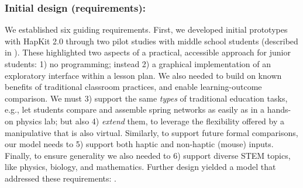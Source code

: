 \subsubsection{Initial design (requirements):}
We established six guiding requirements. %
First, we developed initial prototypes with HapKit 2.0
through two pilot studies with middle school students (described in \cite{Martinez2016}).
These highlighted two aspects of a practical, accessible approach for junior students: 1) no programming; instead 2) a graphical implementation of an exploratory interface within a lesson plan.
We also needed to build on known benefits of traditional classroom practices, and enable learning-outcome comparison.
We must 3) 
support the same \textit{types} of traditional education tasks, e.g., let students  compare and assemble spring networks as easily as in a hands-on physics lab; 
but also 4) \textit{extend} them, to leverage the flexibility offered by a manipulative that is also virtual.
Similarly, to support future formal comparisons, %
our model needs to 5) support both haptic and non-haptic (mouse) inputs.
Finally, to ensure generality we also needed to 6) support diverse STEM topics, like physics, biology, and mathematics.
Further design yielded a model that addressed these requirements: \HandsOn.


